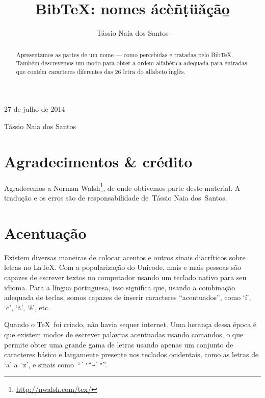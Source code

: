 \documentclass[article,openany]{memoir}
\title{Bib\TeX: nomes ácèñ\d{t}ü\v{a}çã\b{o}}
\author{Tássio Naia dos Santos}
\begin{document}



\hfill 27 de julho de 2014

\medskip

\noindent Tássio Naia dos Santos



\bigskip

\begin{abstract}
Apresentamos as partes de um nome --- como percebidas e tratadas pelo
Bib\TeX. Também descrevemos um modo para obter a ordem alfabética
adequada para entradas que contém caracteres diferentes das 26 letra
do alfabeto inglês.
\end{abstract}


\chapter*{Agradecimentos \& crédito}

Agradecemos a Norman Walsh\footnote{\url{http://nwalsh.com/tex/}}, de
onde obtivemos parte deste material. A tradução e os erros são de
responsabilidade de~Tássio Naia dos~Santos.



\chapter{Acentuação}

Existem diversas maneiras de colocar acentos e outros sinais
diacríticos sobre letras no \LaTeX. Com a popularização do Unicode,
mais e mais pessoas são capazes de escrever textos no computador
usando um teclado nativo para seu idioma. Para a língua portuguesa,
isso significa que, usando a combinação adequada de teclas, somos
capazes de inserir caracteres ``acentuados'', como `í', `c', `ã', `ê',
etc.

Quando o \TeX\ foi criado, não havia sequer internet. Uma herança
dessa época é que existem modos de escrever palavras acentuadas usando
comandos, o que permite obter uma grande gama de letras usando apenas
um conjunto de caracteres básico e largamente presente nos teclados
ocidentais, como as letras de `a' a~`z', e sinais
como~``\verb/`'^~`"/''.
\end{document}
